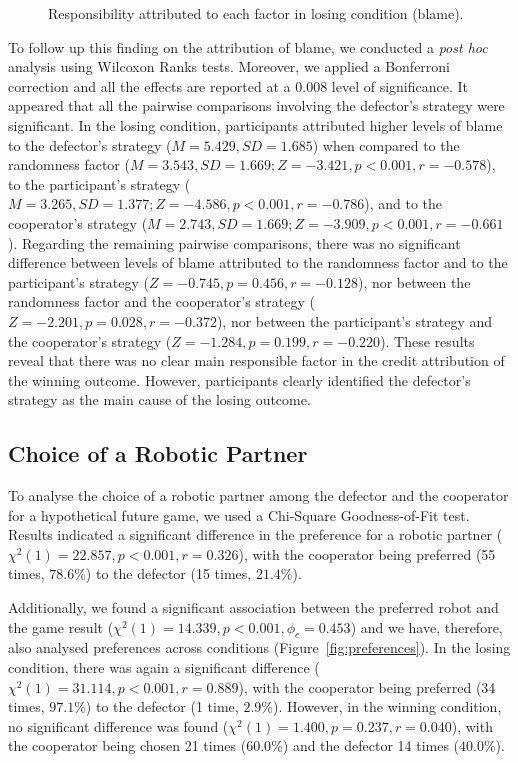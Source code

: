 \begin{figure}[ht]
\centering

\caption{Responsibility attributed to each factor in losing condition (blame).}
\label{fig:blame}
\end{figure}


To follow up this finding on the attribution of blame, we conducted a \textit{post hoc} analysis using Wilcoxon Ranks tests. Moreover, we applied a Bonferroni correction and all the effects are reported at a $0.008$ level of significance. It appeared that all the pairwise comparisons involving the defector's strategy were significant. In the losing condition, participants attributed higher levels of blame to the defector's strategy ($M=5.429, SD=1.685$) when compared to the randomness factor ($M=3.543, SD=1.669; Z=-3.421, p<0.001, r=-0.578$), to the participant's strategy ($M= 3.265, SD=1.377; Z=-4.586, p<0.001, r=-0.786$), and to the cooperator's strategy ($M= 2.743, SD=1.669; Z=-3.909, p<0.001, r=-0.661$). Regarding the remaining pairwise comparisons, there was no significant difference between levels of blame attributed to the randomness factor and to the participant's strategy ($Z=-0.745, p=0.456, r=-0.128$), nor between the randomness factor and the cooperator's strategy ($Z=-2.201, p=0.028, r=-0.372$), nor between the participant's strategy and the cooperator's strategy ($Z=-1.284, p=0.199, r=-0.220$). These results reveal that there was no clear main responsible factor in the credit attribution of the winning outcome. However, participants clearly identified the defector's strategy as the main cause of the losing outcome.


\subsection{Choice of a Robotic Partner}

To analyse the choice of a robotic partner among the defector and the cooperator for a hypothetical future game, we used a Chi-Square Goodness-of-Fit test. Results indicated a significant difference in the preference for a robotic partner ($\chi^2(1)=22.857, p<0.001, r=0.326$), with the cooperator being preferred (55 times, $78.6$\%) to the defector (15 times, $21.4$\%).

Additionally, we found a significant association between the preferred robot and the game result ($\chi^2(1)=14.339, p<0.001, \phi_c=0.453$) and we have, therefore, also analysed preferences across conditions (Figure~\ref{fig:preferences}). In the losing condition, there was again a significant difference ($\chi^2(1)=31.114, p<0.001, r=0.889$), with the cooperator being preferred (34 times, $97.1$\%) to the defector (1 time, $2.9$\%). However, in the winning condition, no significant difference was found ($\chi^2(1)=1.400, p=0.237, r=0.040$), with the cooperator being chosen 21 times ($60.0$\%) and the defector 14 times ($40.0$\%).


